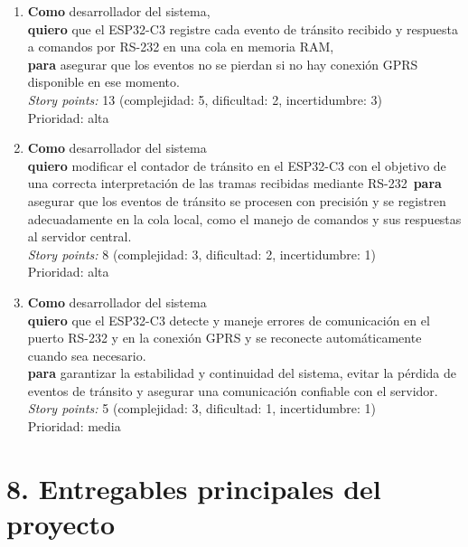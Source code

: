 \documentclass[
11pt, %
]{charter}
\begin{document}
\begin{enumerate}
\item 
\textbf{Como} desarrollador del sistema,\\
\textbf{quiero} que el ESP32-C3 registre cada evento de tránsito recibido y respuesta a comandos por RS-232 en una cola en memoria RAM,\\
\textbf{para} asegurar que los eventos no se pierdan si no hay conexión GPRS disponible en ese momento.\\
\textit{Story points:} 13 (complejidad: 5, dificultad: 2, incertidumbre: 3)\\
Prioridad: alta

\item 
\textbf{Como} desarrollador del sistema\\
\textbf{quiero} modificar el contador de tránsito en el ESP32-C3 con el objetivo de una correcta interpretación de las tramas recibidas mediante RS-232\
\textbf{para} asegurar que los eventos de tránsito se procesen con precisión y se registren adecuadamente en la cola local, como el manejo de comandos y sus respuestas al servidor central.\\
\textit{Story points:} 8 (complejidad: 3, dificultad: 2, incertidumbre: 1)\\
Prioridad: alta

\item
\textbf{Como} desarrollador del sistema\\
\textbf{quiero} que el ESP32-C3 detecte y maneje errores de comunicación en el puerto RS-232 y en la conexión GPRS y se reconecte automáticamente cuando sea necesario.\\
\textbf{para} garantizar la estabilidad y continuidad del sistema, evitar la pérdida de eventos de tránsito y asegurar una comunicación confiable con el servidor.\\
\textit{Story points:} 5 (complejidad: 3, dificultad: 1, incertidumbre: 1)\\
Prioridad: media

\end{enumerate}

\section{8. Entregables principales del proyecto}
\label{sec:entregables}
\end{document}
